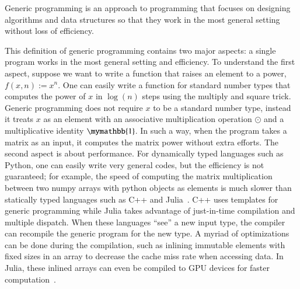 \documentclass[onefignum, onetabnum]{siamart190516}
\newcommand{\<}{\langle}
\renewcommand{\>}{\rangle}
\newcounter{example}
\begin{document}
\begin{definition}
   Generic programming is an approach to programming that focuses on designing algorithms and data structures so that they work in the most general setting without loss of efficiency. ~\cite{Stepanov2014}
\end{definition}

This definition of generic programming contains two major aspects: a single program works in the most general setting and efficiency.
To understand the first aspect, suppose we want to write a function that raises an element to a power, $f(x, n) := x^n$.
One can easily write a function for standard number types that computes the power of $x$ in $\log(n)$ steps using the multiply and square trick.
Generic programming does not require $x$ to be a standard number type,
instead it treats $x$ as an element with an associative multiplication operation $\odot$ and a multiplicative identity $\mymathbb{1}$.
In such a way, when the program takes a matrix as an input, it computes the matrix power without extra efforts.
The second aspect is about performance. For dynamically typed languages such as Python,
one can easily write very general codes, but the efficiency is not guaranteed; for example, the speed of computing the matrix multiplication between two numpy arrays with python objects as elements is much slower than statically typed languages such as C++ and Julia~\cite{Bezanson2012}.
C++ uses templates for generic programming while Julia takes advantage of just-in-time compilation and multiple dispatch.
When these languages ``see'' a new input type, the compiler can recompile the generic program for the new type.
A myriad of optimizations can be done during the compilation, such as inlining immutable elements with fixed sizes in an array to decrease the cache miss rate when accessing data.
In Julia, these inlined arrays can even be compiled to GPU devices for faster computation~\cite{Besard2018}.
\end{document}
